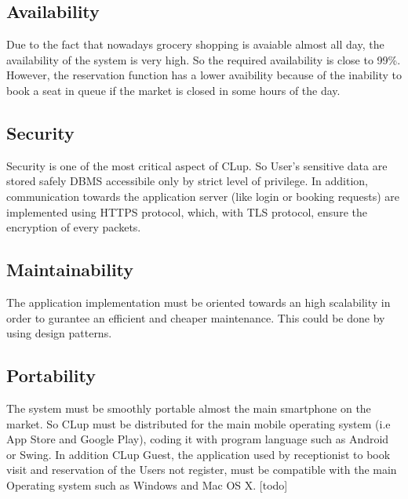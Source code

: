 \subsection{Availability}
Due to the fact that nowadays grocery shopping is avaiable almost all day, the availability of the system is very high. So the required availability is close to 99\%. However, the reservation function has a lower avaibility because of the inability to book a seat in queue if the market is closed in some hours of the day. 
\subsection{Security}
Security is one of the most critical aspect of CLup. So User's sensitive data are stored safely DBMS accessibile only by strict level of privilege. In addition, communication towards the application server (like login or booking requests) are implemented using  HTTPS protocol, which, with TLS protocol, ensure the encryption of every packets. 
\subsection{Maintainability}
The application implementation must be oriented towards an high scalability in order to gurantee an efficient and cheaper maintenance. This could be done by using design patterns.
\subsection{Portability}
The system must be smoothly portable almost the main smartphone on the market. So CLup must be distributed for the main mobile operating system (i.e App Store and Google Play), coding it with program language such as Android or Swing. In addition CLup Guest, the application used by receptionist to book visit and reservation of the Users not register, must be compatible with the main Operating system such as Windows and Mac OS X. [todo]